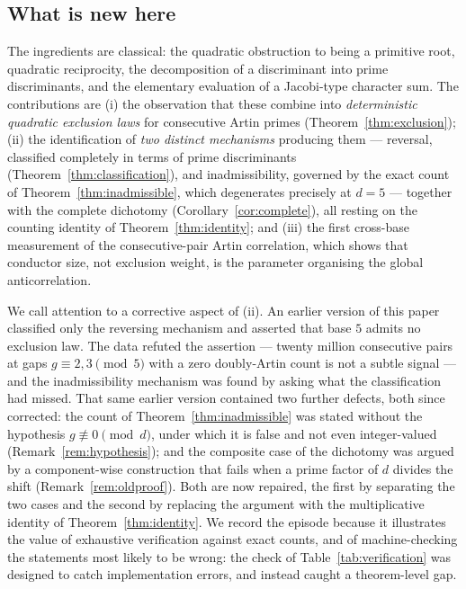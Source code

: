 \documentclass[11pt,reqno]{amsart}
\theoremstyle{plain}
\theoremstyle{definition}
\begin{document}
\subsection*{What is new here}
The ingredients are classical: the quadratic obstruction to being a primitive
root, quadratic reciprocity, the decomposition of a discriminant into prime
discriminants, and the elementary evaluation of a Jacobi-type character sum. The
contributions are (i) the observation that these combine into
\emph{deterministic quadratic exclusion laws} for consecutive Artin primes
(Theorem~\ref{thm:exclusion}); (ii) the identification of \emph{two distinct
mechanisms} producing them --- reversal, classified completely in terms of prime
discriminants (Theorem~\ref{thm:classification}), and inadmissibility,
governed by the exact count of Theorem~\ref{thm:inadmissible}, which
degenerates precisely at $d = 5$ --- together with the complete dichotomy
(Corollary~\ref{cor:complete}), all resting on the counting identity of
Theorem~\ref{thm:identity}; and (iii) the first cross-base measurement of
the consecutive-pair Artin correlation, which shows that conductor size, not
exclusion weight, is the parameter organising the global anticorrelation.

We call attention to a corrective aspect of (ii). An earlier version of this
paper classified only the reversing mechanism and asserted that base $5$
admits no exclusion law. The data refuted the assertion --- twenty million
consecutive pairs at gaps $g \equiv 2, 3 \pmod 5$ with a zero doubly-Artin
count is not a subtle signal --- and the inadmissibility mechanism was found
by asking what the classification had missed. That same earlier version
contained two further defects, both since corrected: the count of
Theorem~\ref{thm:inadmissible} was stated without the hypothesis
$g \not\equiv 0 \pmod d$, under which it is false and not even
integer-valued (Remark~\ref{rem:hypothesis}); and the composite case of the
dichotomy was argued by a component-wise construction that fails when a prime
factor of $d$ divides the shift (Remark~\ref{rem:oldproof}). Both are now
repaired, the first by separating the two cases and the second by replacing
the argument with the multiplicative identity of Theorem~\ref{thm:identity}.
We record the episode because it illustrates the value of exhaustive
verification against exact counts, and of machine-checking the statements most
likely to be wrong: the check of Table~\ref{tab:verification} was designed to
catch implementation errors, and instead caught a theorem-level gap.
\end{document}
